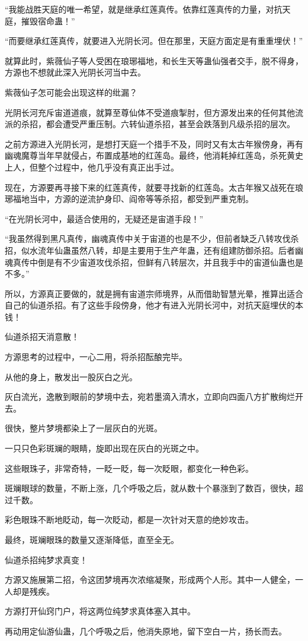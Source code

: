 \begin{this_body}
“我能战胜天庭的唯一希望，就是继承红莲真传。依靠红莲真传的力量，对抗天庭，摧毁宿命蛊！”

“而要继承红莲真传，就要进入光阴长河。但在那里，天庭方面定是有重重埋伏！”

就算此时，紫薇仙子等人受困在琅琊福地，和长生天等蛊仙强者交手，脱不得身，方源也不想就此深入光阴长河当中去。

紫薇仙子怎可能会出现这样的纰漏？

光阴长河充斥宙道道痕，就算至尊仙体不受道痕掣肘，但方源发出来的任何其他流派的杀招，都会遭受严重压制。六转仙道杀招，甚至会跌落到凡级杀招的层次。

之前方源进入光阴长河，是想打天庭一个措手不及，同时又有太古年猴傍身，再有幽魂魔尊当年早就侵占，布置成基地的红莲岛。最终，他消耗掉红莲岛，杀死黄史上人，但整个过程中，他几乎没有真正出手过。

现在，方源要再寻接下来的红莲真传，就要寻找新的红莲岛。太古年猴又战死在琅琊福地当中，方源的逆流护身印、阎帝等等杀招，都受到严重克制。

“在光阴长河中，最适合使用的，无疑还是宙道手段！”

“我虽然得到黑凡真传，幽魂真传中关于宙道的也是不少，但前者缺乏八转攻伐杀招，似水流年仙蛊虽然八转，却是主要用于生产年蛊，还有组建防御杀招。后者幽魂真传中倒是有不少宙道攻伐杀招，但鲜有八转层次，并且我手中的宙道仙蛊也是不多。”

所以，方源真正要做的，就是拥有宙道宗师境界，从而借助智慧光晕，推算出适合自己的仙道杀招。有了这些手段傍身，他才有进入光阴长河中，对抗天庭埋伏的本钱！

仙道杀招天消意散！

方源思考的过程中，一心二用，将杀招酝酿完毕。

从他的身上，散发出一股灰白之光。

灰白流光，逸散到眼前的梦境中去，宛若墨滴入清水，立即向四面八方扩散绚烂开去。

很快，整片梦境都染上了一层灰白的光斑。

一只只色彩斑斓的眼睛，旋即出现在灰白的光斑之中。

这些眼珠子，非常奇特，一眨一眨，每一次眨眼，都变化一种色彩。

斑斓眼球的数量，不断上涨，几个呼吸之后，就从数十个暴涨到了数百，很快，超过千数。

彩色眼珠不断地眨动，每一次眨动，都是一次针对天意的绝妙攻击。

最终，斑斓眼珠的数量又逐渐降低，直至全无。

仙道杀招纯梦求真变！

方源又施展第二招，令这团梦境再次浓缩凝聚，形成两个人形。其中一人健全，一人却是残疾。

方源打开仙窍门户，将这两位纯梦求真体塞入其中。

再动用定仙游仙蛊，几个呼吸之后，他消失原地，留下空白一片，扬长而去。

\end{this_body}

